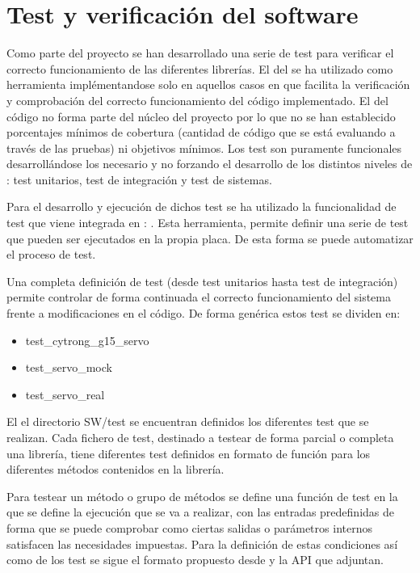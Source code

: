 \section{Test y verificación del software} \label{sec:SW:test}
    Como parte del proyecto se han desarrollado una serie de test para verificar el correcto funcionamiento de las diferentes librerías. El  del  se ha utilizado como herramienta implémentandose solo en aquellos casos en que facilita la verificación y comprobación del correcto funcionamiento del código implementado. El  del código no forma parte del núcleo del proyecto por lo que no se han establecido porcentajes mínimos de cobertura (cantidad de código que se está evaluando a través de las pruebas) ni objetivos mínimos. Los test son puramente funcionales desarrollándose los necesario y no forzando el desarrollo de los distintos niveles de : test unitarios, test de integración y test de sistemas. 

    Para el desarrollo y ejecución de dichos test se ha utilizado la funcionalidad de test que viene integrada en : . Esta herramienta, permite definir una serie de test que pueden ser ejecutados en la propia placa. De esta forma se puede automatizar el proceso de test.

    Una completa definición de test (desde test unitarios hasta test de integración) permite controlar de forma continuada el correcto funcionamiento del sistema frente a modificaciones en el código. De forma genérica estos test se dividen en:

    \begin{itemize}
        \item test\_cytrong\_g15\_servo 
        \item test\_servo\_mock
        \item test\_servo\_real
    \end{itemize}

    El el directorio SW/test se encuentran definidos los diferentes test que se realizan. Cada fichero de test, destinado a testear de forma parcial o completa una librería, tiene diferentes test definidos en formato de función para los diferentes métodos contenidos en la librería.

    Para testear un método o grupo de métodos se define una función de test en la que se define la ejecución que se va a realizar, con las entradas predefinidas de forma que se puede comprobar como ciertas salidas o parámetros internos satisfacen las necesidades impuestas. Para la definición de estas condiciones así como de los test se sigue el formato propuesto desde  y la API que adjuntan.


